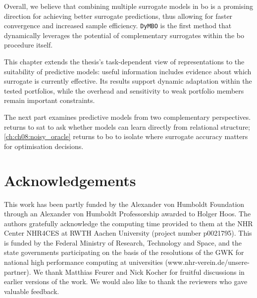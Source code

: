 Overall, we believe that combining multiple surrogate models in \gls{bo} is a promising direction for achieving better surrogate predictions, thus allowing for faster convergence and increased sample efficiency.
\texttt{DyMBO} is the first method that dynamically leverages the potential of complementary surrogates within the \gls{bo} procedure itself.

This chapter extends the thesis's task-dependent view of representations to the suitability of predictive models: useful information includes evidence about which surrogate is currently effective. Its results support dynamic adaptation within the tested portfolios, while the overhead and sensitivity to weak portfolio members remain important constraints.

The next part examines predictive models from two complementary perspectives.  returns to \gls{sat} to ask whether models can learn directly from relational structure; \cref{ch:ch08:noisy_oracle} returns to \gls{bo} to isolate where surrogate accuracy matters for optimisation decisions.

\section*{Acknowledgements}
This work has been partly funded by the Alexander von Humboldt Foundation through an Alexander von Humboldt Professorship awarded to Holger Hoos.
The authors gratefully acknowledge the computing time provided to them at the NHR Center NHR4CES at RWTH Aachen University (project number p0021795). This is funded by the Federal Ministry of Research, Technology and Space, and the state governments participating on the basis of the resolutions of the GWK for national high performance computing at universities (www.nhr-verein.de/unsere-partner).
We thank Matthias Feurer and Nick Kocher for fruitful discussions in earlier versions of the work.
We would also like to thank the reviewers who gave valuable feedback.
